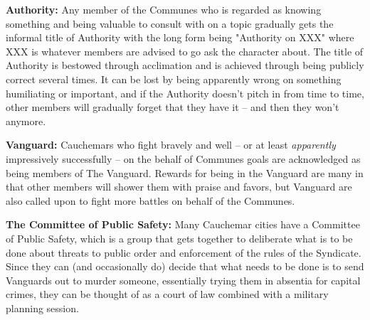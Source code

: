 \textbf{Authority:} Any member of the Communes who is regarded as knowing something and being valuable to consult with on a topic gradually gets the informal title of Authority with the long form being "Authority on XXX" where XXX is whatever members are advised to go ask the character about. The title of Authority is bestowed through acclimation and is achieved through being publicly correct several times. It can be lost by being apparently wrong on something humiliating or important, and if the Authority doesn't pitch in from time to time, other members will gradually forget that they have it -- and then they won't anymore.

\textbf{Vanguard:} Cauchemars who fight bravely and well -- or at least \textit{apparently} impressively successfully -- on the behalf of Communes goals are acknowledged as being members of The Vanguard. Rewards for being in the Vanguard are many in that other members will shower them with praise and favors, but Vanguard are also called upon to fight more battles on behalf of the Communes.

\textbf{The Committee of Public Safety:} Many Cauchemar cities have a Committee of Public Safety, which is a group that gets together to deliberate what is to be done about threats to public order and enforcement of the rules of the Syndicate. Since they can (and occasionally do) decide that what needs to be done is to send Vanguards out to murder someone, essentially trying them in absentia for capital crimes, they can be thought of as a court of law combined with a military planning session.
